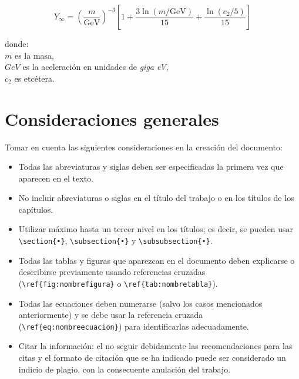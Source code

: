 \begin{equation}
Y_\infty = \left( \frac{m}{\textrm{GeV}} \right)^{-3}
    \left[ 1 + \frac{3 \ln(m/\textrm{GeV})}{15}
    + \frac{\ln(c_2/5)}{15} \right]
\label{eq:eq3}
\end{equation}

\noindent
donde:\\
$m$ es la masa, \\
$GeV$ es la aceleración en unidades de \textit{giga eV}, \\
$c_2$ es etcétera. 

\section{Consideraciones generales}
\label{sec:consideraciones}

Tomar en cuenta las siguientes consideraciones en la creación del documento: 

\begin{itemize}
\item Todas las abreviaturas y siglas deben ser especificadas la primera vez que aparecen en el texto.
\item No incluir abreviaturas o siglas en el título del trabajo o en los títulos de los capítulos.
\item Utilizar máximo hasta un tercer nivel en los títulos; es decir, se pueden usar \verb|\section{•}|, \verb|\subsection{•}|  y \verb|\subsubsection{•}|.
\item Todas las tablas y figuras que aparezcan en el documento deben explicarse o describirse previamente usando referencias cruzadas (\verb|\ref{fig:nombrefigura}| o \verb|\ref{tab:nombretabla}|). 
\item Todas las ecuaciones deben numerarse (salvo los casos mencionados anteriormente) y se debe usar la referencia cruzada (\verb|\ref{eq:nombreecuacion}|) para identificarlas adecuadamente. 
\item Citar la información: el no seguir debidamente las recomendaciones para las citas y el formato de citación que se ha indicado puede ser considerado un indicio de plagio, con la consecuente anulación del trabajo. 
\end{itemize}

